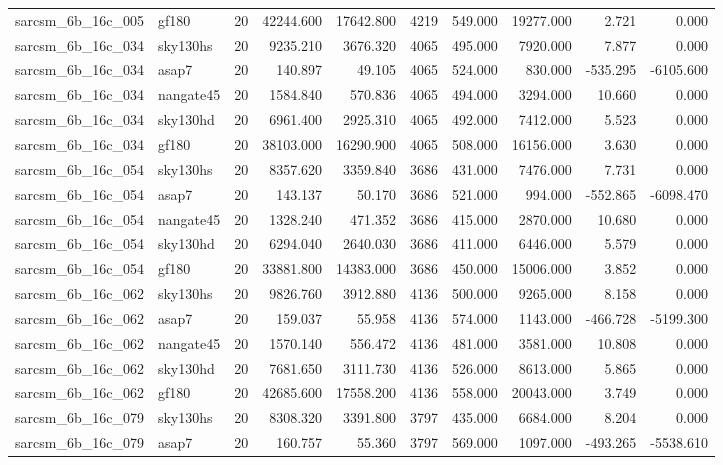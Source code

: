 \documentclass{article}
\begin{document}
\begin{longtable}{llrrrrrrrr}
sarcsm\_6b\_16c\_005 & gf180 & 20 & 42244.600 & 17642.800 & 4219 & 549.000 & 19277.000 & 2.721 & 0.000 \\
sarcsm\_6b\_16c\_034 & sky130hs & 20 & 9235.210 & 3676.320 & 4065 & 495.000 & 7920.000 & 7.877 & 0.000 \\
sarcsm\_6b\_16c\_034 & asap7 & 20 & 140.897 & 49.105 & 4065 & 524.000 & 830.000 & -535.295 & -6105.600 \\
sarcsm\_6b\_16c\_034 & nangate45 & 20 & 1584.840 & 570.836 & 4065 & 494.000 & 3294.000 & 10.660 & 0.000 \\
sarcsm\_6b\_16c\_034 & sky130hd & 20 & 6961.400 & 2925.310 & 4065 & 492.000 & 7412.000 & 5.523 & 0.000 \\
sarcsm\_6b\_16c\_034 & gf180 & 20 & 38103.000 & 16290.900 & 4065 & 508.000 & 16156.000 & 3.630 & 0.000 \\
sarcsm\_6b\_16c\_054 & sky130hs & 20 & 8357.620 & 3359.840 & 3686 & 431.000 & 7476.000 & 7.731 & 0.000 \\
sarcsm\_6b\_16c\_054 & asap7 & 20 & 143.137 & 50.170 & 3686 & 521.000 & 994.000 & -552.865 & -6098.470 \\
sarcsm\_6b\_16c\_054 & nangate45 & 20 & 1328.240 & 471.352 & 3686 & 415.000 & 2870.000 & 10.680 & 0.000 \\
sarcsm\_6b\_16c\_054 & sky130hd & 20 & 6294.040 & 2640.030 & 3686 & 411.000 & 6446.000 & 5.579 & 0.000 \\
sarcsm\_6b\_16c\_054 & gf180 & 20 & 33881.800 & 14383.000 & 3686 & 450.000 & 15006.000 & 3.852 & 0.000 \\
sarcsm\_6b\_16c\_062 & sky130hs & 20 & 9826.760 & 3912.880 & 4136 & 500.000 & 9265.000 & 8.158 & 0.000 \\
sarcsm\_6b\_16c\_062 & asap7 & 20 & 159.037 & 55.958 & 4136 & 574.000 & 1143.000 & -466.728 & -5199.300 \\
sarcsm\_6b\_16c\_062 & nangate45 & 20 & 1570.140 & 556.472 & 4136 & 481.000 & 3581.000 & 10.808 & 0.000 \\
sarcsm\_6b\_16c\_062 & sky130hd & 20 & 7681.650 & 3111.730 & 4136 & 526.000 & 8613.000 & 5.865 & 0.000 \\
sarcsm\_6b\_16c\_062 & gf180 & 20 & 42685.600 & 17558.200 & 4136 & 558.000 & 20043.000 & 3.749 & 0.000 \\
sarcsm\_6b\_16c\_079 & sky130hs & 20 & 8308.320 & 3391.800 & 3797 & 435.000 & 6684.000 & 8.204 & 0.000 \\
sarcsm\_6b\_16c\_079 & asap7 & 20 & 160.757 & 55.360 & 3797 & 569.000 & 1097.000 & -493.265 & -5538.610 \\

\end{longtable}
\end{document}
